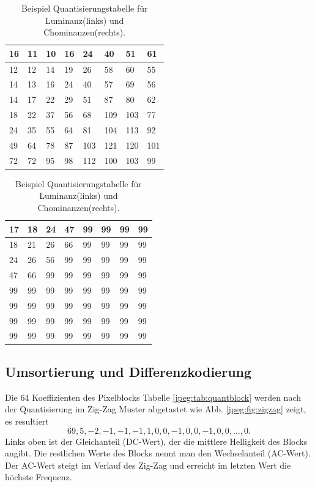 \begin{table}[b]
    \centering
    \begin{tabularx}{0.47\linewidth}{|X|X|X|X|X|X|X|X|}
        \hline
        16 & 11 & 10 & 16 & 24  & 40 & 51 & 61    \\ \hline
        12 & 12 & 14 & 19 & 26  & 58 & 60 & 55    \\ \hline
        14 & 13 & 16 & 24 & 40  & 57 & 69 & 56    \\ \hline
        14 & 17 & 22 & 29 & 51  & 87 & 80 & 62    \\ \hline
        18 & 22 & 37 & 56 & 68  & 109 & 103 & 77  \\ \hline
        24 & 35 & 55 & 64 & 81  & 104 & 113 & 92  \\ \hline
        49 & 64 & 78 & 87 & 103 & 121 & 120 & 101 \\ \hline
        72 & 72 & 95 & 98 & 112 & 100 & 103 & 99  \\ \hline        
    \end{tabularx}
    \qquad
    \begin{tabularx}{0.47\linewidth}{|X|X|X|X|X|X|X|X|}
        \hline
        17 & 18 & 24 & 47 & 99 & 99 & 99 & 99  \\ \hline
        18 & 21 & 26 & 66 & 99 & 99 & 99 & 99  \\ \hline
        24 & 26 & 56 & 99 & 99 & 99 & 99 & 99  \\ \hline
        47 & 66 & 99 & 99 & 99 & 99 & 99 & 99  \\ \hline
        99 & 99 & 99 & 99 & 99 & 99 & 99 & 99  \\ \hline
        99 & 99 & 99 & 99 & 99 & 99 & 99 & 99  \\ \hline
        99 & 99 & 99 & 99 & 99 & 99 & 99 & 99  \\ \hline
        99 & 99 & 99 & 99 & 99 & 99 & 99 & 99  \\ \hline  	  
    \end{tabularx}
    \caption{Beispiel Quantisierungstabelle für Luminanz(links) und Chominanzen(rechts).
        \label{jpeg:tab:quant}}
\end{table}



\subsection{Umsortierung und Differenzkodierung
\label{jpeg:subsection:umsortierung}}
Die 64 Koeffizienten des Pixelblocks Tabelle \ref{jpeg:tab:quantblock} werden nach der Quantisierung im Zig-Zag Muster abgetastet wie Abb. \ref{jpeg:fig:zigzag} zeigt, es resultiert
\begin{equation}
    69, 5, -2, -1, -1, -1, 1, 0, 0, -1, 0, 0, -1, 0, 0,\dots, 0.
    \label{jpeg:equation:abgetastet}
\end{equation}
Links oben ist der Gleichanteil (DC-Wert), der die mittlere Helligkeit des Blocks angibt.
Die restlichen Werte des Blocks nennt man den Wechselanteil (AC-Wert).
Der AC-Wert steigt im Verlauf des Zig-Zag und erreicht im letzten Wert die höchste Frequenz.

